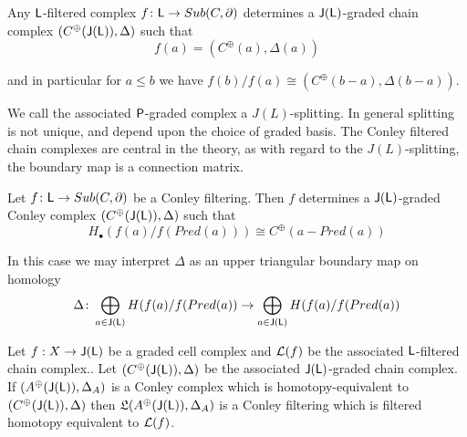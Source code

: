 \begin{cor}
\label{prop:Lsplitting}
Any ${\mathsf L}$-filtered complex $f\colon {\mathsf L}\to Sub(C,\partial)$ determines a ${\mathsf J}({\mathsf L})$-graded chain complex $(C^\oplus({\mathsf J}({\mathsf L})),\Delta)$  such that $$f(a)= (C^\oplus(a),\Delta(a))$$

and in particular for $a\leq b$ we have $f(b)/f(a) \cong (C^\oplus(b-a),\Delta(b-a))$.

\end{cor}

We call the associated ${\mathsf P}$-graded complex a $J(L)$-splitting.  In general splitting is not unique, and depend upon the choice of graded basis.   The Conley filtered chain complexes are central in the theory, as with regard to the $J(L)$-splitting, the boundary map is a connection matrix.

\begin{cor}
Let $f\colon {\mathsf L} \to Sub(C,\partial)$  be a Conley filtering. Then $f$ determines a ${\mathsf J}({\mathsf L})$-graded Conley complex $(C^\oplus({\mathsf J}({\mathsf L})),\Delta)$ such that
\[
H_\bullet(f(a)/f(Pred(a))) \cong C^\oplus(a-Pred(a))
\]
\end{cor}

In this case we may interpret $\Delta$ as an upper triangular boundary map on homology
\[
\Delta \colon \bigoplus_{a\in {\mathsf J}({\mathsf L})} H(f(a)/f(Pred(a)) \to \bigoplus_{a\in {\mathsf J}({\mathsf L})} H(f(a)/f(Pred(a))
\]


\begin{thm}
Let $f:X\to {\mathsf J}({\mathsf L})$ be a graded cell complex and ${\mathcal L}(f)$ be the associated ${\mathsf L}$-filtered chain complex..  Let $(C^\oplus({\mathsf J}({\mathsf L})),\Delta)$ be the associated ${\mathsf J}({\mathsf L})$-graded chain complex.  If $(A^\oplus({\mathsf J}({\mathsf L})),\Delta_A)$ is a Conley complex which is homotopy-equivalent to $(C^\oplus({\mathsf J}({\mathsf L})),\Delta)$ then $\mathfrak{L}(A^\oplus({\mathsf J}({\mathsf L})),\Delta_A)$ is a Conley filtering which is filtered homotopy equivalent to ${\mathcal L}(f)$.
\end{thm}












